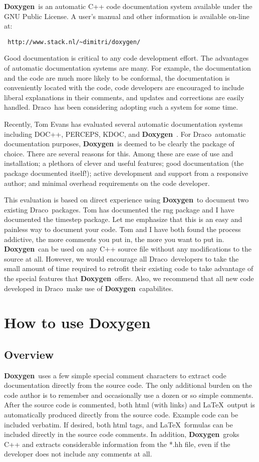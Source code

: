 \documentclass[11pt]{nmemo}
\newcommand{\draco}{{\normalfont\sffamily Draco}}
\newcommand{\doxy}{{\normalfont\bfseries Doxygen}}
\begin{document}
\doxy\ is an automatic C++ code documentation system available under
the GNU Public License. 
 A user's manual and other information is available on-line at:
\begin{verbatim} http://www.stack.nl/~dimitri/doxygen/ \end{verbatim}

Good documentation is critical to any code development effort.
The advantages of automatic documentation systems are many. 
For example, the documentation  and the code are much more likely to
be conformal, the documentation is conveniently located with the code,
code developers are encouraged to include liberal explanations in their 
comments, and updates and corrections are easily handled.
\draco\ has been considering adopting such a system for some time.


Recently, Tom Evans has evaluated several automatic documentation systems
including DOC++, PERCEPS, KDOC, and \doxy\ . 
For \draco\ automatic documentation purposes, \doxy\ is deemed to be clearly
the package of choice. There are several reasons for this. Among these are
ease of use and installation; a plethora of clever and useful features;
good documentation (the package documented itself!);
active development and support from a responsive author; and 
minimal overhead requirements on the code developer.


This evaluation is based on direct experience using \doxy\ to document
two existing \draco\ packages.
Tom has documented the rng package and I have documented the timestep
package.
Let me emphasize that this is an easy and painless way to document your
code. Tom and I have both found the process addictive, the more comments
you put in, the more you want to put in. \doxy\ can be used on any
C++ source file without any modifications to the source at all. However,
we would encourage all \draco\
developers to take the small amount of time required to retrofit their
 existing code
to take advantage of the special features that \doxy\ offers. 
Also, we recommend that all new code developed in \draco\ make use
of \doxy\ capabilites.

\section{How to use \doxy\ }

\subsection{Overview}
\doxy\ uses a few simple special comment characters to extract code
documentation directly from the source code. The only additional burden
on the code author is to remember and occasionally use a dozen or so
simple comments. After the source code is commented, both html (with links)
and \LaTeX\ output is automatically produced directly from the source code.
Example code can be included verbatim. If desired, both  html tags, and \LaTeX\
formulas can be included directly in the source code comments. In addition,
\doxy\ groks C++ and extracts considerable information from the *.hh
file, even if the developer does not include any comments at all.
\end{document}
